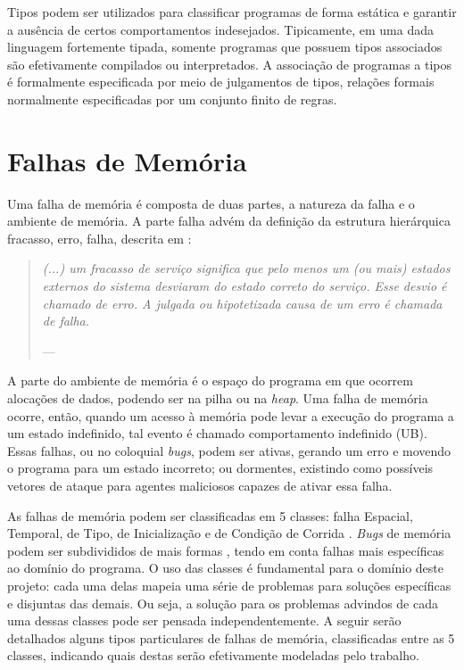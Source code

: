 Tipos podem ser utilizados para classificar programas de forma estática e garantir a ausência de certos comportamentos indesejados. Tipicamente, em uma dada linguagem fortemente tipada, somente programas que possuem tipos associados são efetivamente compilados ou interpretados. A associação de programas a tipos é formalmente especificada por meio de julgamentos de tipos, relações formais normalmente especificadas por um conjunto finito de regras. %


\section{Falhas de Memória}
\label{sec:mem-error}

Uma falha de memória é composta de duas partes, a natureza da falha e o ambiente de memória. A parte falha advém da definição da estrutura hierárquica fracasso, erro, falha, descrita em \citet{FAULTS}: 
\begin{quotation}\textit{
	(...) um fracasso de serviço significa que pelo menos um (ou mais) estados externos do sistema desviaram do estado correto do serviço. Esse desvio é chamado de erro. A julgada ou hipotetizada causa de um erro é chamada de falha.}

	\hspace{1em plus 1fill}---\citet[p. 13, tradução nossa]{FAULTS}
\end{quotation}

A parte do ambiente de memória é o espaço do programa em que ocorrem alocações de dados, podendo ser na pilha ou na \emph{heap}. Uma falha de memória ocorre, então, quando um acesso à memória pode levar a execução do programa a um estado indefinido, tal evento é chamado comportamento indefinido (UB). Essas falhas, ou no coloquial \emph{bugs}, podem ser ativas, gerando um erro e movendo o programa para um estado incorreto; ou dormentes, existindo como possíveis vetores de ataque para agentes maliciosos capazes de ativar essa falha. 

As falhas de memória podem ser classificadas em 5 classes: falha Espacial, Temporal, de Tipo, de Inicialização e de Condição de Corrida \cite{Apple22,Google24}. \emph{Bugs} de memória podem ser subdivididos de mais formas \cite{7KINGDOMS,CWELIST}, tendo em conta falhas mais específicas ao domínio do programa. O uso das classes é fundamental para o domínio deste projeto: cada uma delas mapeia uma série de problemas para soluções específicas e disjuntas das demais.  Ou seja, a solução para os problemas advindos de cada uma dessas classes pode ser pensada independentemente. A seguir serão detalhados alguns tipos particulares de falhas de memória, classificadas entre as 5 classes, indicando quais destas serão efetivamente modeladas pelo trabalho.

